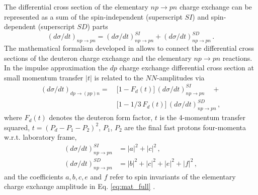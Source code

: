 \documentclass[twocolumn,epjc3]{svjour3}
\newcommand{\np}     {\ensuremath{np \rightarrow pn}\xspace}
\newcommand{\dpchex} {\ensuremath{dp \rightarrow (pp)n}\xspace}
\begin{document}
The differential cross section of the elementary \np charge exchange can be
represented as a sum of the spin-independent (superscript $SI$) and
spin-dependent (superscript $SD$) parts
\begin{equation}
  \label{eq:np_sum}
  (d\sigma/dt)_{\np} = (d\sigma/dt)^{SI}_{\np} + (d\sigma/dt)^{SD}_{\np}\,.
\end{equation}
The mathematical formalism developed in \cite{dea72, dea72_2, bug87} allows to
connect the differential cross sections of the deuteron charge exchange and the
elementary \np reactions. In the impulse approximation the $dp$ charge exchange
differential cross section at small momentum transfer $|t|$ is related to the
$NN$-amplitudes via
\begin{equation}
  \label{eq:dp_13np}
  \begin{split}
    (d\sigma/dt)_{\dpchex} =\ &\bigl[1 - F_d(t)\bigr]\,(d\sigma/dt)^{SI}_{\np}
    \quad + \\
    &\bigl[1 - 1/3\,F_d(t)\bigr]\,(d\sigma/dt)^{SD}_{\np}\,,
  \end{split}
\end{equation}
where $F_d(t)$ denotes the deuteron form factor, $t$ is the 4-momentum transfer
squared, $t = (P_d - P_1 - P_2)^2$, $P_1$, $P_2$ are the final fast protons
four-momenta w.r.t. laboratory frame,
\begin{equation}
  \begin{split}
    (d\sigma/dt)^{SI}_{\np} &= |a|^2 +|c|^2\,,\\
    (d\sigma/dt)^{SD}_{\np} &= |b|^2 + |c|^2 + |e|^2 + |f|^2\,,
  \end{split}
\end{equation}
and the coefficients $a, b, c, e$ and $f$ refer to spin invariants of the
elementary charge exchange amplitude in Eq. \eqref{eq:mat_full}
\cite{dea72,ala75_2}.
\end{document}
